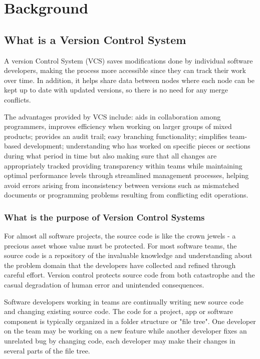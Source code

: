 \chapter{Background}
\section{What is a Version Control System}
A version Control System (VCS) saves modifications done by individual software developers, making the process more accessible since they can track their work over time. In addition, it helps share data between nodes where each node can be kept up to date with updated versions, so there is no need for any merge conflicts.

The advantages provided by VCS include: aids in collaboration among programmers, improves efficiency when working on larger groups of mixed products; provides an audit trail; easy branching functionality; simplifies team-based development; understanding who has worked on specific pieces or sections during what period in time but also making sure that all changes are appropriately tracked providing transparency within teams while maintaining optimal performance levels through streamlined management processes, helping avoid errors arising from inconsistency between versions such as mismatched documents or programming problems resulting from conflicting edit operations.
\subsection{What is the purpose of Version Control Systems}
For almost all software projects, the source code is like the crown jewels - a precious asset whose value must be protected. For most software teams, the source code is a repository of the invaluable knowledge and understanding about the problem domain that the developers have collected and refined through careful effort. Version control protects source code from both catastrophe and the casual degradation of human error and unintended consequences.

Software developers working in teams are continually writing new source code and changing existing source code. The code for a project, app or software component is typically organized in a folder structure or "file tree". One developer on the team may be working on a new feature while another developer fixes an unrelated bug by changing code, each developer may make their changes in several parts of the file tree.

